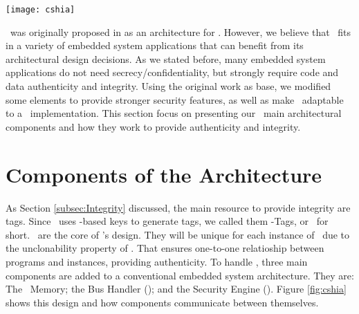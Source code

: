 

\begin{figure*}[!ht]
	\centering
	\texttt{[image: cshia]}
	\caption{The \cshia~architecture.}
	\label{fig:cshia}
\end{figure*}

\cshia~was originally proposed in \cite{Hoffman2015} as an architecture for \iot. However, we believe that \cshia~fits in a variety of embedded system applications that can benefit from its architectural design decisions. As we stated before, many embedded system applications do not need secrecy\slash{}confidentiality, but strongly require code and data authenticity and integrity. Using the original work as base, we modified some elements to provide stronger security features, as well as make \cshia~adaptable to a \fpga~implementation. This section focus on presenting our \cshia~main architectural components and how they work to provide authenticity and integrity.

\section{Components of the Architecture}
\label{sec:Components-of-the-Architecture}

As Section \ref{subsec:Integrity} discussed, the main resource to provide integrity are tags. Since \cshia~uses \puf-based keys to generate tags, we called them \puf-Tags, or \ptags~for short. \ptags~are the core of \cshia's design. They will be unique for each instance of \cshia~due to the unclonability property of \pufs. That ensures one-to-one relatioship between programs and instances, providing authenticity. To handle \ptags, three main components are added to a conventional embedded system architecture. They are: The \ptag~Memory; the Bus Handler (\handler); and the Security Engine (\seceng). Figure \ref{fig:cshia} shows this design and how components communicate between themselves. 

